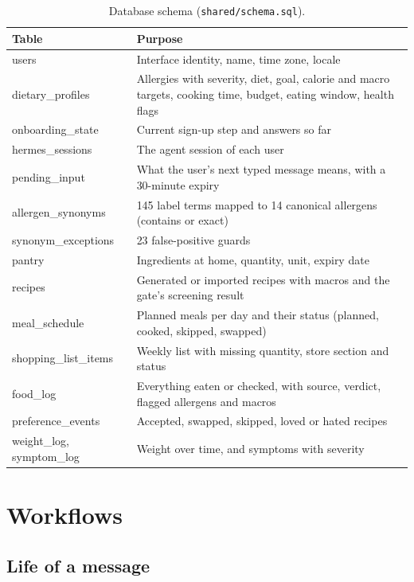 \documentclass[11pt,a4paper]{article}
\begin{document}
\begin{table}[H]
\centering\small
\caption{Database schema (\texttt{shared/schema.sql}).}
\label{tab:schema}
\begin{tabularx}{\textwidth}{@{}l Y@{}}
\toprule
Table & Purpose \\
\midrule
users & Interface identity, name, time zone, locale \\
dietary\_profiles & Allergies with severity, diet, goal, calorie and macro targets, cooking time, budget,
  eating window, health flags \\
onboarding\_state & Current sign-up step and answers so far \\
hermes\_sessions & The agent session of each user \\
pending\_input & What the user's next typed message means, with a 30-minute expiry \\
allergen\_synonyms & 145 label terms mapped to 14 canonical allergens (contains or exact) \\
synonym\_exceptions & 23 false-positive guards \\
pantry & Ingredients at home, quantity, unit, expiry date \\
recipes & Generated or imported recipes with macros and the gate's screening result \\
meal\_schedule & Planned meals per day and their status (planned, cooked, skipped, swapped) \\
shopping\_list\_items & Weekly list with missing quantity, store section and status \\
food\_log & Everything eaten or checked, with source, verdict, flagged allergens and macros \\
preference\_events & Accepted, swapped, skipped, loved or hated recipes \\
weight\_log, symptom\_log & Weight over time, and symptoms with severity \\
\bottomrule
\end{tabularx}
\end{table}

\section{Workflows}\label{sec:workflows}

\subsection{Life of a message}
\end{document}
